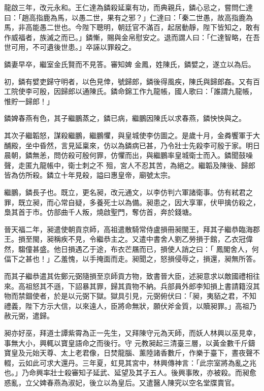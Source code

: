 \begin{pinyinscope}
 龍啟三年，改元永和。王仁達為鏻殺延稟有功，而典親兵，鏻心忌之，嘗問仁達曰：「趙高指鹿為馬，以愚二世，果有之邪？」仁達曰：「秦二世愚，故高指鹿為馬，非高能愚二世也。今陛下聰明，朝廷官不滿百，起居動靜，陛下皆知之，敢有作威福者，族滅之而已。」鏻慚，賜與金帛慰安之。退而謂人曰：「仁達智略，在吾世可用，不可遺後世患。」卒誣以罪殺之。



 鏻妻早卒，繼室金氏賢而不見答。審知婢
 金鳳，姓陳氏，鏻嬖之，遂立以為后。



 初，鏻有嬖吏歸守明者，以色見倖，號歸郎，鏻後得風疾，陳氏與歸郎姦。又有百工院使李可殷，因歸郎以通陳氏。鏻命錦工作九龍帳，國人歌曰：「誰謂九龍帳，惟貯一歸郎！」



 鏻婢春燕有色，其子繼鵬蒸之，鏻已病，繼鵬因陳氏以求春燕，鏻怏怏與之。



 其次子繼韜怒，謀殺繼鵬，繼鵬懼，與皇城使李仿圖之。是歲十月，金粦饗軍于大酺殿，坐中昏然，言見延稟來，仿以為鏻病已甚，乃令壯士先殺李可殷于家。明日晨朝，鏻無恙，問仿殺可殷何罪，仿懼而出，與繼鵬率皇城衛士而入。鏻聞鼓噪聲，走匿九龍帳中，衛士刺之不
 殂，宮人不忍其苦，為絕之。繼韜及陳後、歸郎皆為仿所殺。鏻立十年見殺，謚曰惠皇帝，廟號太宗。



 繼鵬，鏻長子也。既立，更名昶，改元通文，以李仿判六軍諸衛事。仿有弒君之罪，既立昶，而心常自疑，多養死士以為備。昶患之，因大享軍，伏甲擒仿殺之，梟其首于市。仿部曲千人叛，燒啟聖門，奪仿首，奔於錢塘。



 晉天福二年，昶遣使朝貢京師，高祖遣散騎常侍盧損冊昶閩王，拜其子繼恭臨海郡王。損至閩，昶稱疾不見，令繼恭主之。又遣中書舍人劉乙勞損于館，乙衣冠偉然，騶僮甚盛。他日損遇乙于途，布衣芒屩而已，損使人誚之曰：「
 鳳閣舍人，何偪下之甚也！」乙羞愧，以手掩面而走。昶聞之，怒損侵辱之，損還，昶無所答。



 而其子繼恭遣其佐鄭元弼隨損至京師貢方物，致書晉大臣，述昶意求以敵國禮相往來。高祖怒其不遜，下詔暴其罪，歸其貢物不納。兵部員外郎李知損上書請籍沒其物而禁錮使者，於是以元弼下獄。獄具引見，元弼俯伏曰：「昶，夷貊之君，不知禮義，陛下方示大信，以來遠人，臣將命無狀，願伏斧金質，以贖昶罪。」高祖乃赦元弼，遣歸。



 昶亦好巫，拜道士譚紫霄為正一先生，又拜陳守元為天師，而妖人林興以巫見幸，事無大小，興輒以寶皇語命之而後行。守
 元教昶起三清臺三層，以黃金數千斤鑄寶皇及元始天尊、太上老君像，日焚龍腦、薰陸諸香數斤，作樂于臺下，晝夜聲不輟，云如此可求大還丹。三年夏，虹見其宮中，林興傳神言：「此宗室將為亂之兆也。」乃命興率壯士殺審知子延武、延望及其子五人。後興事敗，亦被殺。而昶愈惑亂，立父婢春燕為淑妃，後立以為皇后。又遣醫人陳究以空名堂牒賣官。




\end{pinyinscope}

